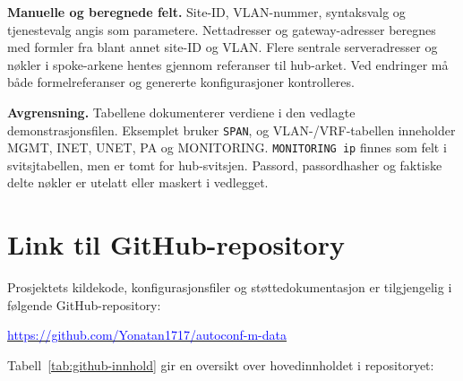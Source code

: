 \medskip
\noindent
\textbf{Manuelle og beregnede felt.}
Site-ID, VLAN-nummer, syntaksvalg og tjenestevalg angis som parametere.
Nettadresser og gateway-adresser beregnes med formler fra blant annet
site-ID og VLAN. Flere sentrale serveradresser og nøkler i spoke-arkene
hentes gjennom referanser til hub-arket. Ved endringer må både
formelreferanser og genererte konfigurasjoner kontrolleres.

\medskip
\noindent
\textbf{Avgrensning.}
Tabellene dokumenterer verdiene i den vedlagte demonstrasjonsfilen.
Eksemplet bruker \texttt{SPAN}, og VLAN-/VRF-tabellen inneholder MGMT,
INET, UNET, PA og MONITORING. \texttt{MONITORING ip} finnes som felt i svitsjtabellen,
men er tomt for hub-svitsjen. Passord, passordhasher og faktiske delte
nøkler er utelatt eller maskert i vedlegget.

\clearpage
\section{Link til GitHub-repository}
\label{sec:vedlegg-git}

Prosjektets kildekode, konfigurasjonsfiler og støttedokumentasjon er tilgjengelig i følgende GitHub-repository:

\begin{center}
    \href{https://github.com/Yonatan1717/autoconf-m-data}
    {\textcolor{blue}{https://github.com/Yonatan1717/autoconf-m-data}}
\end{center}

Tabell~\ref{tab:github-innhold} gir en oversikt over hovedinnholdet i repositoryet: 

